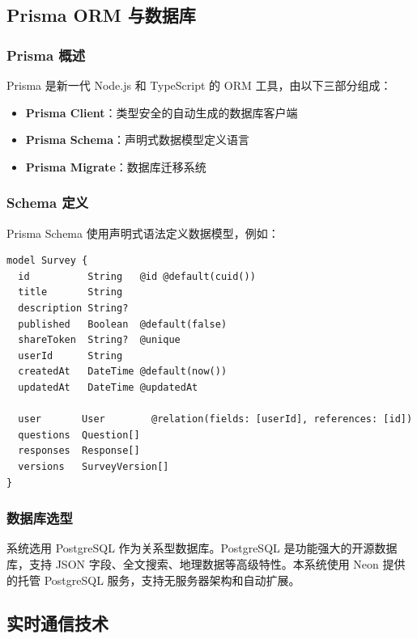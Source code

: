 \subsection{Prisma ORM 与数据库}

\subsubsection{Prisma 概述}

Prisma 是新一代 Node.js 和 TypeScript 的 ORM 工具，由以下三部分组成：

\begin{itemize}
  \item \textbf{Prisma Client}：类型安全的自动生成的数据库客户端
  \item \textbf{Prisma Schema}：声明式数据模型定义语言
  \item \textbf{Prisma Migrate}：数据库迁移系统
\end{itemize}

\subsubsection{Schema 定义}

Prisma Schema 使用声明式语法定义数据模型，例如：

\begin{listing}[H]
\begin{verbatim}
model Survey {
  id          String   @id @default(cuid())
  title       String
  description String?
  published   Boolean  @default(false)
  shareToken  String?  @unique
  userId      String
  createdAt   DateTime @default(now())
  updatedAt   DateTime @updatedAt

  user       User        @relation(fields: [userId], references: [id])
  questions  Question[]
  responses  Response[]
  versions   SurveyVersion[]
}
\end{verbatim}
\caption{Prisma Schema 示例}
\end{listing}

\subsubsection{数据库选型}

系统选用 PostgreSQL 作为关系型数据库。PostgreSQL 是功能强大的开源数据库，支持 JSON 字段、全文搜索、地理数据等高级特性。本系统使用 Neon 提供的托管 PostgreSQL 服务，支持无服务器架构和自动扩展。

\subsection{实时通信技术}

